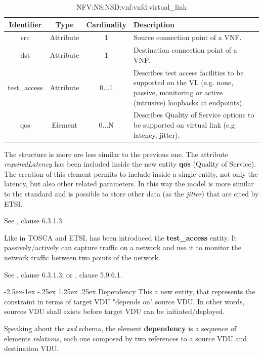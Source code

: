 \documentclass[11pt, english]{article}
\makeatletter
\renewcommand\paragraph{\@startsection{paragraph}{4}{\z@}%
            {-2.5ex\@plus -1ex \@minus -.25ex}%
            {1.25ex \@plus .25ex}%
            {\normalfont\normalsize\bfseries}}
\makeatother
\begin{document}
\begin{table}[ht]
    \centering
    \begin{tabular}{c|c|c|m{7cm}}
    \hline
    Identifier & Type & Cardinality & Description \\
    \hline
    \rowcolor{Gray}
    src & Attribute & 1 & Source connection point of a VNF. \\
    \hline
    dst & Attribute & 1 & Destination connection point of a VNF. \\
    \hline
    \rowcolor{Gray}
    test\_access & Attribute & 0...1 & Describes test access facilities to be supported on the VL (e.g. none, passive, monitoring or active (intrusive) loopbacks at endpoints). \\
    \hline
    qos & Element & 0...N &  Describes Quality of Service options to be supported on virtual link (e.g latency, jitter). \\
    \hline
    \end{tabular}
    \caption{NFV:NS:NSD:vnf:vnfd:virtual\_link} \label{tab:tab9}
\end{table}

The structure is more ore less similar to the previous one. The attribute \emph{requiredLatency} has been included inside the new entity \textbf{qos} (Quality of Service). The creation of this element permits to include inside a single entity, not only the latency, but also other related parameters. In this way the model is more similar to the standard and is possible to store other data (as the \textit{jitter}) that are cited by ETSI.

See \cite{etsi}, clause 6.3.1.3.

Like in TOSCA and ETSI, has been introduced the \textbf{test\_access} entity. It passively/actively can  capture traffic on a network and use it to monitor the network traffic between two points of the network.

See \cite{etsi}, clause 6.3.1.3; or \cite{tosca}, clause 5.9.6.1.

\paragraph{Dependency}
This a new entity, that represents the constraint in terms of target VDU "depends on" source VDU. In other words, sources VDU shall exists before target VDU can be initiated/deployed. 

Speaking about the \textit{xsd} schema, the element \textbf{dependency} is a sequence of elements \emph{relations}, each one composed by two references to a source VDU and destination VDU.
\end{document}
